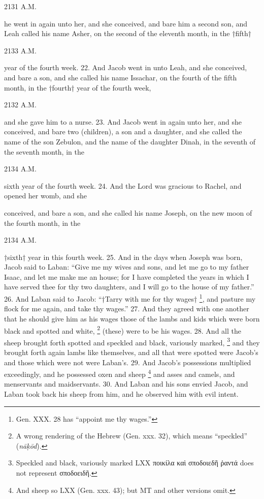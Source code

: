 2131 A.M.

he went in again unto her, and she conceived, and bare him a second son, and Leah called his name Asher, on the second of the eleventh month, in the †fifth†

2133 A.M.

year of the fourth week. 22. And Jacob went in unto Leah, and she conceived, and bare a son, and she called his name Issachar, on the fourth of the fifth month, in the †fourth† year of the fourth week,

2132 A.M.

and she gave him to a nurse. 23. And Jacob went in again unto her, and she conceived, and bare two (children), a son and a daughter, and she called the name of the son Zebulon, and the name of the daughter Dinah, in the seventh of the seventh month, in the

2134 A.M.

sixth year of the fourth week. 24. And the Lord was gracious to Rachel, and opened her womb, and she

conceived, and bare a son, and she called his name Joseph, on the new moon of the fourth month, in the

2134 A.M.

†sixth† year in this fourth week. 25. And in the days when Joseph was born, Jacob said to Laban: ``Give me my wives and sons, and let me go to my father Isaac, and let me make me an house; for I have completed the years in which I have served thee for thy two daughters, and I will go to the house of my father.'' 26. And Laban said to Jacob: ``†Tarry with me for thy wages† \footnote{Gen. XXX. 28 has ``appoint me thy wages.''}, and pasture my flock for me again, and take thy wages.'' 27. And they agreed with one another that he should give him as his wages those of the lambs and kids which were born black and spotted and white, \footnote{A wrong rendering of the Hebrew (Gen. xxx. 32), which means ``speckled'' (\emph{nā\d{k}ōd}).} (these) were to be his wages. 28. And all the sheep brought forth spotted and speckled and black, variously marked, \footnote{Speckled and black, variously marked LXX \textgreek{ποικίλα καὶ σποδοιεδῆ ῥαντά} does not represent \textgreek{σποδοειδῆ}.} and they brought forth again lambs like themselves, and all that were spotted were Jacob's and those which were not were Laban's. 29. And Jacob's possessions multiplied exceedingly, and he possessed oxen and sheep \footnote{And sheep so LXX (Gen. xxx. 43); but MT and other versions omit.} and asses and camels, and menservants and maidservants. 30. And Laban and his sons envied Jacob, and Laban took back his sheep from him, and he observed him with evil intent.

